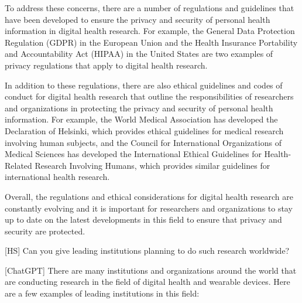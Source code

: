 \documentclass[
]{bxjsbook}
\theoremstyle{definition}
\theoremstyle{definition}
\theoremstyle{definition}
\theoremstyle{definition}
\theoremstyle{remark}
\begin{document}
To address these concerns, there are a number of regulations and guidelines that have been developed to ensure the privacy and security of personal health information in digital health research. For example, the General Data Protection Regulation (GDPR) in the European Union and the Health Insurance Portability and Accountability Act (HIPAA) in the United States are two examples of privacy regulations that apply to digital health research.

In addition to these regulations, there are also ethical guidelines and codes of conduct for digital health research that outline the responsibilities of researchers and organizations in protecting the privacy and security of personal health information. For example, the World Medical Association has developed the Declaration of Helsinki, which provides ethical guidelines for medical research involving human subjects, and the Council for International Organizations of Medical Sciences has developed the International Ethical Guidelines for Health-Related Research Involving Humans, which provides similar guidelines for international health research.

Overall, the regulations and ethical considerations for digital health research are constantly evolving and it is important for researchers and organizations to stay up to date on the latest developments in this field to ensure that privacy and security are protected.

{[}HS{]} Can you give leading institutions planning to do such research worldwide?

{[}ChatGPT{]} There are many institutions and organizations around the world that are conducting research in the field of digital health and wearable devices. Here are a few examples of leading institutions in this field:
\end{document}
